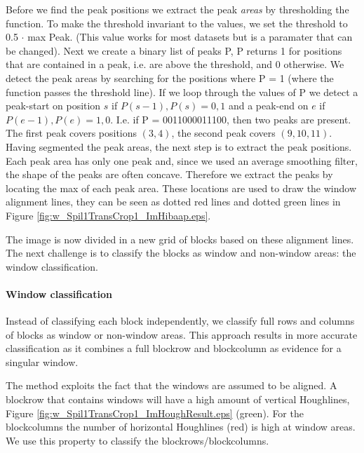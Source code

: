 Before we find the peak positions we extract the peak \emph{areas} by thresholding the
function. To make the threshold invariant to the values, we set the threshold to 0.5 $\cdot$ max Peak. 
(This value works for most datasets but is a paramater that can be changed).
Next we create a binary list of peaks P, P returns 1 for positions that are contained in
a peak, i.e. are above the threshold, and 0 otherwise.
We detect the peak areas by searching for the positions where P = 1
(where the function passes the threshold line). 
If we loop through the values of P we detect a peak-start on position $s$ if ${P(s-1),P(s)}={0,1}$
and a peak-end on $e$ if ${P(e-1),P(e)}={1,0}$. 
I.e. if P = 0011000011100, then two peaks are present. The first peak covers positions $(3,4)$, 
the second peak covers $(9,10,11)$.\\

Having segmented the peak areas, the next step is to extract the peak positions. 
Each peak area has only one peak and, since we used an average smoothing filter, the shape of 
the peaks are often concave. Therefore we extract the peaks by locating the max of each peak area. 
These locations are used to draw the window alignment lines, they can be seen
as dotted red lines and dotted green lines in Figure \ref{fig:w_Spil1TransCrop1_ImHibaap.eps}.

The image is now divided in a new grid of blocks based on these
alignment lines. The next challenge is to classify the blocks as window and
non-window areas: the window classification.

\paragraph{Window classification}
Instead of classifying each block independently, we classify full rows and
columns of blocks as window or non-window areas.  This approach results in more accurate
classification as it combines a full blockrow and blockcolumn as evidence for a singular
window. 

The method exploits the fact that the windows are assumed to be
aligned.
A blockrow that contains windows will have a high amount of vertical
Houghlines, Figure \ref{fig:w_Spil1TransCrop1_ImHoughResult.eps}
(green). For the blockcolumns the number of horizontal Houghlines
 (red) is high at window areas.  We use this property to classify 
 the blockrows/blockcolumns. 

